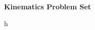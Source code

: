 \documentclass{exam}
\begin{document}
    \vspace*{-25px}
    \begin{center}
        \huge \textbf{Kinematics Problem Set}
    \end{center}
    \vspace*{0.05in}
    \begin{questions}
        \large
        \question h
        
    \end{questions}
\end{document}
